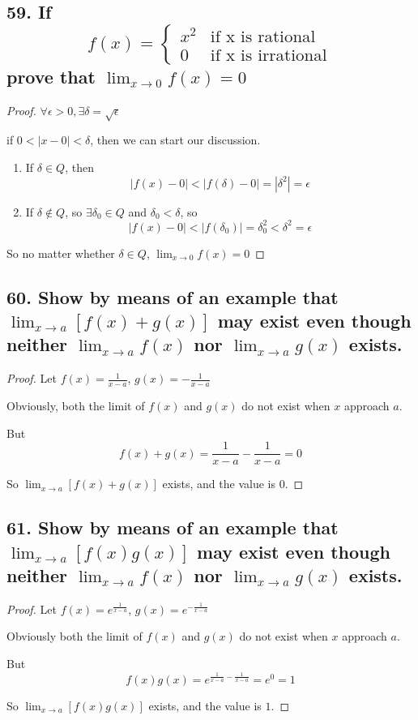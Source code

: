 \documentclass{article}
\begin{document}
    
    \subsection*{59. If $$f(x) = \left\{ \begin{array}{ll} x^2 & \textrm{if x is rational} \\ 0 & \textrm{if x is irrational}  \end{array} \right.$$ prove that $\lim_{x \to 0}f(x) = 0$}

    \begin{proof}
        $\forall \epsilon > 0, \exists \delta = \sqrt{\epsilon}$

        if $0 < |x - 0| < \delta$, then we can start our discussion.

        \begin{enumerate}
            \item If $\delta \in Q$, then $$|f(x) - 0| < |f(\delta) - 0| = |\delta^2| = \epsilon$$
            \item If $\delta \not \in Q$, so $\exists \delta_0 \in Q $ and $ \delta_0 < \delta$, so $$|f(x) - 0| < |f(\delta_0)| = \delta_0^2 < \delta^2 = \epsilon$$
        \end{enumerate}

        So no matter whether $\delta \in Q$, $\lim_{x \to 0}f(x) = 0$

    \end{proof}

    \subsection*{60. Show by means of an example that $\lim_{x \to a}[f(x) + g(x)]$ may exist even though neither $\lim_{x \to a}f(x)$ nor $\lim_{x \to a}g(x)$ exists.}
    \begin{proof}
        Let $f(x) = \frac{1}{x - a}$, $g(x) = -\frac{1}{x - a}$

        Obviously, both the limit of $f(x)$ and $g(x)$ do not exist when $x$ approach $a$.

        But $$f(x) + g(x) = \frac{1}{x - a} - \frac{1}{x - a} = 0$$

        So $\lim_{x \to a}[f(x) + g(x)]$ exists, and the value is $0$.
    \end{proof}

    \subsection*{61. Show by means of an example that $\lim_{x \to a}[f(x)g(x)]$ may exist even though neither $\lim_{x \to a}f(x)$ nor $\lim_{x \to a}g(x)$ exists.}
    \begin{proof}
        Let $f(x) = e^{\frac{1}{x - a}}$, $g(x) = e^{-\frac{1}{x - a}}$

        Obviously both the limit of $f(x)$ and $g(x)$ do not exist when $x$ approach $a$.

        But $$f(x)g(x) = e^{\frac{1}{x - a} - \frac{1}{x - a}} = e^0 = 1$$

        So $\lim_{x \to a}[f(x)g(x)]$ exists, and the value is $1$.
    \end{proof}
\end{document}
